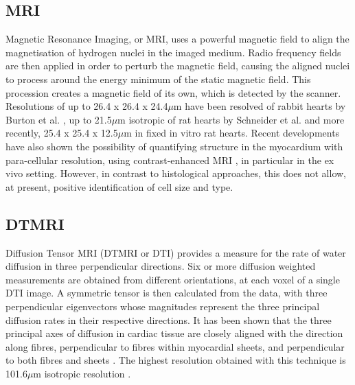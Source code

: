   \subsection{MRI} %
  \label{sub:mri}
    Magnetic Resonance Imaging, or MRI, uses a powerful magnetic field to align the magnetisation of hydrogen nuclei in the imaged medium. Radio frequency fields are then applied in order to perturb the magnetic field, causing the aligned nuclei to process around the energy minimum of the static magnetic field. This procession creates a magnetic field of its own, which is detected by the scanner. Resolutions of up to 26.4 x 26.4 x 24.4$\mu$m have been resolved of rabbit hearts by Burton et al. \cite{Burton2006}, up to 21.5$\mu$m isotropic of rat hearts by Schneider et al. \cite{Schneider2004} and more recently, 25.4 x 25.4 x 12.5$\mu$m in fixed in vitro rat hearts. Recent developments have also shown the possibility of quantifying structure in the myocardium with para-cellular resolution, using contrast-enhanced MRI \cite{Gilbert2012}, in particular in the ex vivo setting. However, in contrast to histological approaches, this does not allow, at present, positive identification of cell size and type.
    
  \subsection{DTMRI} %
  \label{sub:dtmri}
    Diffusion Tensor MRI (DTMRI or DTI) provides a measure for the rate of water diffusion in three perpendicular directions. Six or more diffusion weighted measurements are obtained from different orientations, at each voxel of a single DTI image. A symmetric tensor is then calculated from the data, with three perpendicular eigenvectors whose magnitudes represent the three principal diffusion rates in their respective directions. It has been shown that the three principal axes of diffusion in cardiac tissue are closely aligned with the direction along fibres, perpendicular to fibres within myocardial sheets, and perpendicular to both fibres and sheets \cite{Scollan1998}. The highest resolution obtained with this technique is 101.6$\mu$m isotropic resolution \cite{Bishop2009}.
  
